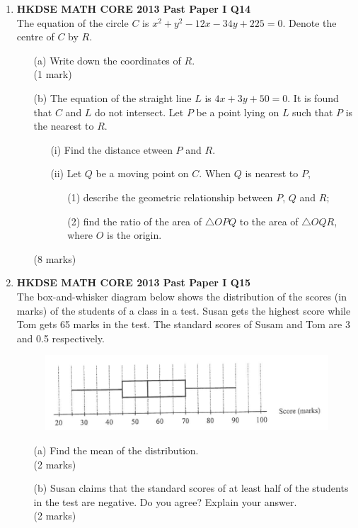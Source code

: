 \documentclass[12pt]{article}
\begin{document}
\begin{enumerate}
	\item \textbf{HKDSE MATH CORE 2013 Past Paper I Q14}\\
	The equation of the circle $C$ is $x^2 + y^2 - 12x - 34y + 225 = 0$. Denote the centre of $C$ by $R$.
	\begin{enumerate}
		\item[(a)] Write down the coordinates of $R$. \\(1 mark)
		\item[(b)] The equation of the straight line $L$ is $4x + 3y + 50 = 0$. It is found that $C$ and $L$ do not intersect. Let $P$ be a point lying on $L$ such that $P$ is the nearest to $R$.
		\begin{enumerate}
			\item[(i)] Find the distance etween $P$ and $R$.
			\item[(ii)] Let $Q$ be a moving point on $C$. When $Q$ is nearest to $P$,
			\begin{enumerate}
				\item[(1)] describe the geometric relationship between $P$, $Q$ and $R$;
				\item[(2)] find the ratio of the area of $\triangle OPQ$ to the area of $\triangle  OQR$, where $O$ is the origin.
			\end{enumerate}
		\end{enumerate}
		(8 marks)
	\end{enumerate}

	\item \textbf{HKDSE MATH CORE 2013 Past Paper I Q15}\\
	The box-and-whisker diagram below shows the distribution of the scores (in marks) of the students of a class in a test. Susan gets the highest score while Tom gets 65 marks in the test. The standard scores of Susam and Tom are 3 and 0.5 respectively.
	\begin{figure}[H]
		\centering
		\includegraphics[width = .3\linewidth]{2013Figure1.01}
	\end{figure}
	\begin{enumerate}
		\item[(a)] Find the mean of the distribution. \\(2 marks)
		\item[(b)] Susan claims that the standard scores of at least half of the students in the test are negative. Do you agree? Explain your answer. \\(2 marks)
	\end{enumerate}


\end{enumerate}
\end{document}

